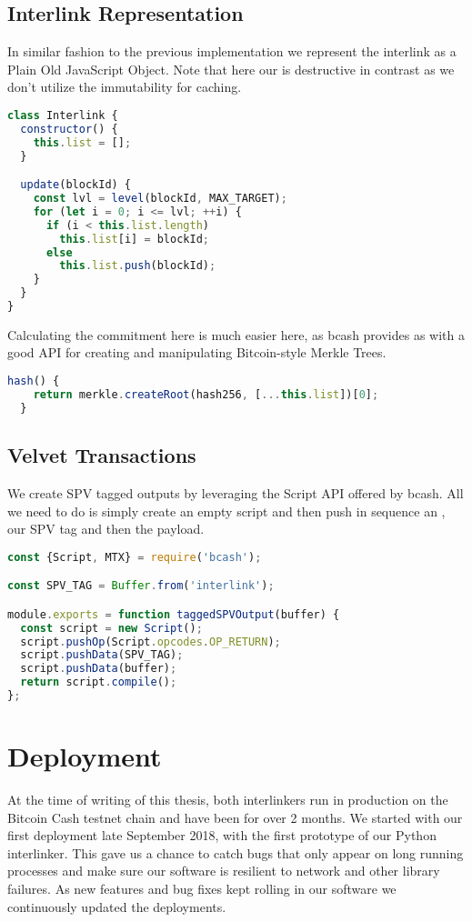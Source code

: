 \subsection{Interlink Representation}
In similar fashion to the previous implementation we represent the interlink as a Plain Old JavaScript Object. Note that here our  is destructive in contrast as we don't utilize the immutability for caching.

\begin{lstlisting}[language=js]
class Interlink {
  constructor() {
    this.list = [];
  }

  update(blockId) {
    const lvl = level(blockId, MAX_TARGET);
    for (let i = 0; i <= lvl; ++i) {
      if (i < this.list.length)
        this.list[i] = blockId;
      else
        this.list.push(blockId);
    }
  }
}
\end{lstlisting}

Calculating the commitment here is much easier here, as bcash provides as with a good API for creating and manipulating Bitcoin-style Merkle Trees.

\begin{lstlisting}[language=js]
  hash() {
    return merkle.createRoot(hash256, [...this.list])[0];
  }
\end{lstlisting}

\subsection{Velvet Transactions}
We create SPV tagged outputs by leveraging the Script API offered by bcash. All we need to do is simply create an empty script and then push in sequence an , our SPV tag and then the payload.

\begin{lstlisting}[language=js]
const {Script, MTX} = require('bcash');

const SPV_TAG = Buffer.from('interlink');

module.exports = function taggedSPVOutput(buffer) {
  const script = new Script();
  script.pushOp(Script.opcodes.OP_RETURN);
  script.pushData(SPV_TAG);
  script.pushData(buffer);
  return script.compile();
};
\end{lstlisting}

\section{Deployment}
At the time of writing of this thesis, both interlinkers run in production on the Bitcoin Cash testnet chain and have been for over 2 months. We started with our first deployment late September 2018, with the first prototype of our Python interlinker. This gave us a chance to catch bugs that only appear on long running processes and make sure our software is resilient to network and other library failures. As new features and bug fixes kept rolling in our software we continuously updated the deployments.

